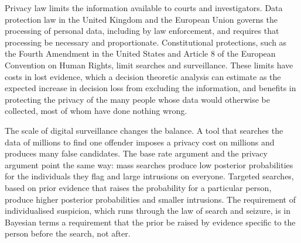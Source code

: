 Privacy law limits the information available to courts and investigators. Data protection law in the United Kingdom and the European Union governs the processing of personal data, including by law enforcement, and requires that processing be necessary and proportionate. Constitutional protections, such as the Fourth Amendment in the United States and Article 8 of the European Convention on Human Rights, limit searches and surveillance. These limits have costs in lost evidence, which a decision theoretic analysis can estimate as the expected increase in decision loss from excluding the information, and benefits in protecting the privacy of the many people whose data would otherwise be collected, most of whom have done nothing wrong.

The scale of digital surveillance changes the balance. A tool that searches the data of millions to find one offender imposes a privacy cost on millions and produces many false candidates. The base rate argument and the privacy argument point the same way: mass searches produce low posterior probabilities for the individuals they flag and large intrusions on everyone. Targeted searches, based on prior evidence that raises the probability for a particular person, produce higher posterior probabilities and smaller intrusions. The requirement of individualised suspicion, which runs through the law of search and seizure, is in Bayesian terms a requirement that the prior be raised by evidence specific to the person before the search, not after.

